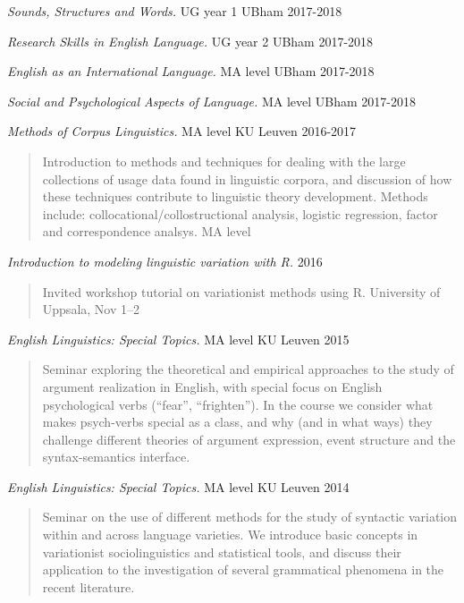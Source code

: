 \documentclass[11pt,]{article}
\begin{document}
\emph{Sounds, Structures and Words.} UG year 1 \hfill UBham 2017-2018

\emph{Research Skills in English Language.} UG year 2 \hfill UBham
2017-2018

\emph{English as an International Language.} MA level \hfill UBham
2017-2018

\emph{Social and Psychological Aspects of Language.} MA level
\hfill UBham 2017-2018

\emph{Methods of Corpus Linguistics.} MA level \hfill KU Leuven
2016-2017

\begin{quote}
Introduction to methods and techniques for dealing with the large
collections of usage data found in linguistic corpora, and discussion of
how these techniques contribute to linguistic theory development.
Methods include: collocational/collostructional analysis, logistic
regression, factor and correspondence analsys. MA level
\end{quote}

\emph{Introduction to modeling linguistic variation with R.} \hfill 2016

\begin{quote}
Invited workshop tutorial on variationist methods using R. University of
Uppsala, Nov 1--2
\end{quote}

\emph{English Linguistics: Special Topics.} MA level \hfill KU Leuven
2015

\begin{quote}
Seminar exploring the theoretical and empirical approaches to the study
of argument realization in English, with special focus on English
psychological verbs (``fear'', ``frighten''). In the course we consider
what makes psych-verbs special as a class, and why (and in what ways)
they challenge different theories of argument expression, event
structure and the syntax-semantics interface.
\end{quote}

\emph{English Linguistics: Special Topics.} MA level \hfill KU Leuven
2014

\begin{quote}
Seminar on the use of different methods for the study of syntactic
variation within and across language varieties. We introduce basic
concepts in variationist sociolinguistics and statistical tools, and
discuss their application to the investigation of several grammatical
phenomena in the recent literature.
\end{quote}
\end{document}

